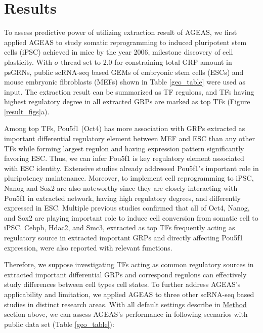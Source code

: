 \documentclass[fleqn,10pt]{wlscirep}
\begin{document}
\section*{Results}
  \label{res}
  To assess predictive power of utilizing extraction result of AGEAS, we first applied AGEAS to study somatic reprogramming to induced pluripotent stem cells (iPSC) achieved in mice by the year 2006, \cite{yamanaka_2006} milestone discovery of cell plasticity. \cite{cell_repro_review}
  With $\sigma$ thread set to 2.0 for constraining total GRP amount in psGRNs, public scRNA-seq based GEMs of embryonic stem cells (ESCs) and mouse embryonic fibroblasts (MEFs) shown in Table \ref{geo_table} were used as input.
  The extraction result can be summarized as TF regulons, and TFs having highest regulatory degree in all extracted GRPs are marked as top TFs (Figure \ref{result_figs}a).

  Among top TFs, Pou5f1 (Oct4) has more association with GRPs extracted as important differential regulatory element between MEF and ESC than any other TFs while forming largest regulon and having expression pattern significantly favoring ESC.
  Thus, we can infer Pou5f1 is key regulatory element associated with ESC identity.
  Extensive studies already addressed Pou5f1's important role in pluripotency maintenance. \cite{niwa_2007, oct4_1, oct4_2}
  Moreover, to implement cell reprogramming to iPSC, Nanog and Sox2 are also noteworthy since they are closely interacting with Pou5f1 in extracted network, having high regulatory degrees, and differently expressed in ESC.
  Multiple previous studies confirmed that all of Oct4, Nanog, and Sox2 are playing important role to induce cell conversion from somatic cell to iPSC. \cite{yamanaka_2006, ips7f, ipsOK, oct4_nanog_sox2_lin28, oct4_nanog_sox2}
  Cebpb, Hdac2, and Smc3, extracted as top TFs frequently acting as regulatory source in extracted important GRPs and directly affecting Pou5f1 expression, were also reported with relevant functions. \cite{cebpb_ipsc, hdac2_ipsc, rad21_smc3_esc}

  Therefore, we suppose investigating TFs acting as common regulatory sources in extracted important differential GRPs and correspond regulons can effectively study differences between cell types cell states.
  To further address AGEAS's applicability and limitation, we applied AGEAS to three other scRNA-seq based studies in distinct research areas.
  With all default settings describe in \hyperref[method]{Method} section above, we can assess AGEAS's performance in following scenarios with public data set (Table \ref{geo_table}):
\end{document}
